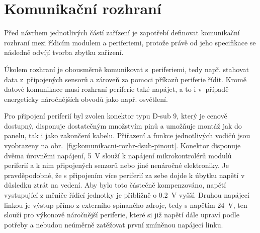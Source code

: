\section{Komunikační rozhraní}
\label{sec:komunikacni-rozhrani}
    Před návrhem jednotlivých částí zařízení je zapotřebí definovat komunikační rozhraní mezi řídicím modulem a periferiemi, protože právě od jeho specifikace se následně odvíjí tvorba zbytku zařízení. 

    Úkolem rozhraní je obousměrně komunikovat s~periferiemi, tedy např. stahovat data z~připojených sensorů a zároveň za pomoci příkazů periferie řídit. Kromě datové komunikace musí rozhraní periferie také napájet, a to i v~případě energeticky náročnějších obvodů jako např. osvětlení. 

    Pro připojení periferií byl zvolen konektor typu D-sub 9, který je cenově dostupný, disponuje dostatečným množstvím pinů a umožňuje montáž jak do panelu, tak i jako zakončení kabelu. Přiřazení a funkce jednotlivých vodičů jsou vyobrazeny na obr.~\ref{fig:komunikacni-rozhr-dsub-pinout}. Konektor disponuje dvěma úrovněmi napájení, \qty{5}{V} slouží k napájení mikrokontrolérů modulů periferií a k nim připojených senzorů nebo jiné nenáročné elektroniky. Je pravděpodobné, že s připojením více periferií za sebe dojde k úbytku napětí v důsledku ztrát na vedení. Aby bylo toto částečně kompenzováno, napětí vystupující z měniče řídicí jednotky je přibližně o \qty{0.2}{V} vyšší. Druhou napájecí linkou je výstup přímo z externího spínaného zdroje, tedy s napětím \qty{24}{V}, ten slouží pro výkonově náročnější periferie, které si již napětí dále upraví podle potřeby a nebudou neúměrně zatěžovat první zmíněnou napájecí linku.

